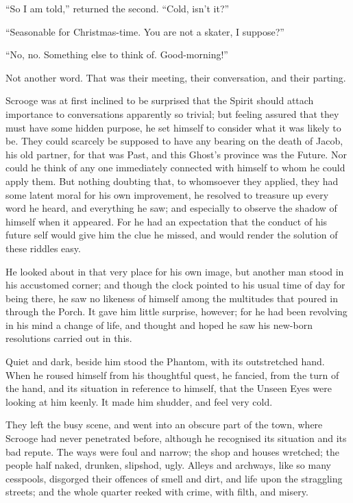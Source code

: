 \documentclass[paper=5.5in:8.5in,BCOR=7mm,twoside,DIV=calc,12pt,usegeometry]{scrbook} %
\begin{document}
\enquote{So I am told,} returned the second. \enquote{Cold, isn't it?}

\enquote{Seasonable for Christmas-time. You are not a skater, I suppose?}

\enquote{No, no. Something else to think of. Good-morning!}

Not another word. That was their meeting, their conversation, and their parting.

Scrooge was at first inclined to be surprised that the Spirit should attach importance to conversations apparently so trivial; but feeling assured that they must have some hidden purpose, he set himself to consider what it was likely to be. They could scarcely be supposed to have any bearing on the death of Jacob, his old partner, for that was Past, and this Ghost's province was the Future. Nor could he think of any one immediately connected with himself to whom he could apply them. But nothing doubting that, to whomsoever they applied, they had some latent moral for his own improvement, he resolved to treasure up every word he heard, and everything he saw; and especially to observe the shadow of himself when it appeared. For he had an expectation that the conduct of his future self would give him the clue he missed, and would render the solution of these riddles easy.

He looked about in that very place for his own image, but another man stood in his accustomed corner; and though the clock pointed to his usual time of day for being there, he saw no likeness of himself among the multitudes that poured in through the Porch. It gave him little surprise, however; for he had been revolving in his mind a change of life, and thought and hoped he saw his new-born resolutions carried out in this.

Quiet and dark, beside him stood the Phantom, with its out\-stretched hand. When he roused himself from his thoughtful quest, he fancied, from the turn of the hand, and its situation in reference to himself, that the Unseen Eyes were looking at him keenly. It made him shudder, and feel very cold.

They left the busy scene, and went into an obscure part of the town, where Scrooge had never penetrated before, although he recognised its situation and its bad repute. The ways were foul and narrow; the shop and houses wretched; the people half naked, drunken, slipshod, ugly. Alleys and archways, like so many cesspools, disgorged their offences of smell and dirt, and life upon the straggling streets; and the whole quarter reeked with crime, with filth, and misery.
\end{document}
